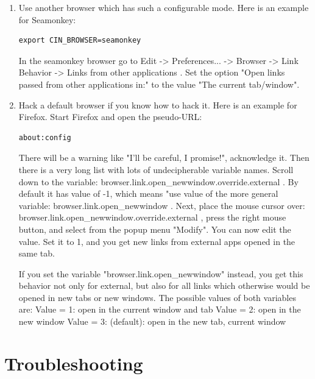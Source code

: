 \begin{enumerate}
	\item Use another browser which has such a configurable mode. Here is an example for Seamonkey:
\begin{lstlisting}[style=sh]
	export CIN_BROWSER=seamonkey
\end{lstlisting}
In the seamonkey browser go to Edit -> Preferences... -> Browser -> Link
Behavior -> Links from other applications .
Set the option "Open links passed from other applications in:" to the value
"The current tab/window".

	\item Hack a default browser if you know how to hack it. Here is an example for Firefox.
Start Firefox and open the pseudo-URL:
\begin{lstlisting}[style=sh]
	about:config
\end{lstlisting}
There will be a warning like "I'll be careful, I promise!", acknowledge it.
Then there is a very long list with lots of undecipherable variable names.
Scroll down to the variable: browser.link.open\_newwindow.override.external .
By default it has value of -1, which means "use value of the more general
variable: browser.link.open\_newwindow .
Next, place the mouse cursor over: browser.link.open\_newwindow.override.external ,
press the right mouse button, and select from the popup menu "Modify".
You can now edit the value. Set it to 1, and you get new links from external
apps opened in the same tab.

If you set the variable "browser.link.open\_newwindow" instead, you get this
behavior not only for external, but also for all links which otherwise would
be opened in new tabs or new windows. The possible values of both variables
are:
\newline \hspace*{1cm} Value = 1: open in the current window and tab
\newline \hspace*{1cm} Value = 2: open in the new window
\newline \hspace*{1cm} Value = 3: (default): open in the new tab, current window
\end{enumerate}

\section{Troubleshooting}%
\label{sec:troubleshooting}

